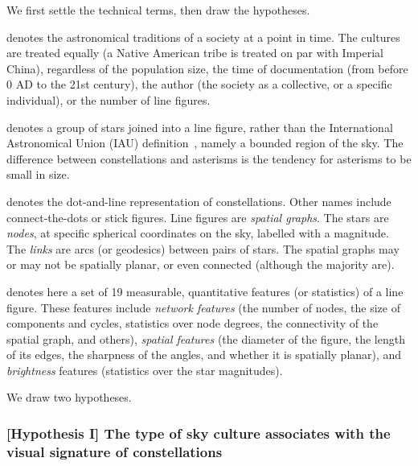 \documentclass[10pt]{article}
\begin{document}
We first settle the technical terms, then draw the hypotheses. 
\begin{description}
	\setlength\itemsep{0mm}
	\item[Sky culture] denotes the astronomical traditions of a society at a point in time. The cultures are treated equally (a Native American tribe is treated on par with Imperial China), regardless of the population size, the time of documentation (from before 0 AD to the 21st century), the author (the society as a collective, or a specific individual), or the number of line figures.
	\item[Constellation or asterism] denotes a group of stars joined into a line figure, rather than the International Astronomical Union (IAU) definition~\cite{IAU}, namely a bounded region of the sky. The difference between constellations and asterisms is the tendency for asterisms to be small in size.
	\item[Line figure] denotes the dot-and-line representation of constellations. Other names include connect-the-dots or stick figures. Line figures are \emph{spatial graphs}. The stars are \emph{nodes}, at specific spherical coordinates on the sky, labelled with a magnitude. The \emph{links} are arcs (or geodesics) between pairs of stars. The spatial graphs may or may not be spatially planar, or even connected (although the majority are).
	\item[Visual signature] denotes here a set of 19 measurable, quantitative features (or statistics) of a line figure. These features include \emph{network features} (the number of nodes, the size of components and cycles, statistics over node degrees, the connectivity of the spatial graph, and others), \emph{spatial features} (the diameter of the figure, the length of its edges, the sharpness of the angles, and whether it is spatially planar), and \emph{brightness} features (statistics over the star magnitudes).
\end{description}

We draw two hypotheses.

\subsubsection*{[Hypothesis I] The type of sky culture associates with the visual signature of constellations}
\end{document}
